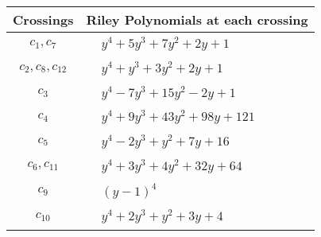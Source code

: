\documentclass[1p]{elsarticle_modified}
\theoremstyle{definition}
\begin{document}
\begin{tabular}{m{50pt}|m{274pt}}
Crossings & \hspace{64pt}Riley Polynomials at each crossing \\
\hline $$\begin{aligned}c_{1},c_{7}\end{aligned}$$&$\begin{aligned}
&y^4+5 y^3+7 y^2+2 y+1
\end{aligned}$\\
\hline $$\begin{aligned}c_{2},c_{8},c_{12}\end{aligned}$$&$\begin{aligned}
&y^4+y^3+3 y^2+2 y+1
\end{aligned}$\\
\hline $$\begin{aligned}c_{3}\end{aligned}$$&$\begin{aligned}
&y^4-7 y^3+15 y^2-2 y+1
\end{aligned}$\\
\hline $$\begin{aligned}c_{4}\end{aligned}$$&$\begin{aligned}
&y^4+9 y^3+43 y^2+98 y+121
\end{aligned}$\\
\hline $$\begin{aligned}c_{5}\end{aligned}$$&$\begin{aligned}
&y^4-2 y^3+y^2+7 y+16
\end{aligned}$\\
\hline $$\begin{aligned}c_{6},c_{11}\end{aligned}$$&$\begin{aligned}
&y^4+3 y^3+4 y^2+32 y+64
\end{aligned}$\\
\hline $$\begin{aligned}c_{9}\end{aligned}$$&$\begin{aligned}
&(y-1)^4
\end{aligned}$\\
\hline $$\begin{aligned}c_{10}\end{aligned}$$&$\begin{aligned}
&y^4+2 y^3+y^2+3 y+4
\end{aligned}$\\
\hline
\end{tabular}\\~\\
\end{document}
